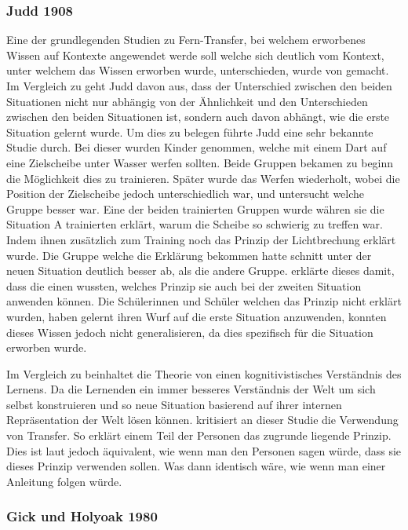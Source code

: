 \subsubsection{Judd 1908}
Eine der grundlegenden Studien zu Fern-Transfer, bei welchem erworbenes Wissen auf Kontexte angewendet werde soll welche sich deutlich vom Kontext, unter welchem das Wissen erworben wurde, unterschieden, wurde von \citet{judd1908} gemacht. Im Vergleich zu \citeauthor{Woodworth1901} geht Judd davon aus, dass der Unterschied zwischen den beiden Situationen nicht nur abhängig von der Ähnlichkeit und den Unterschieden zwischen den beiden Situationen ist, sondern auch davon abhängt, wie die erste Situation gelernt wurde. Um dies zu belegen führte Judd eine sehr bekannte Studie durch. Bei dieser wurden Kinder genommen, welche mit einem Dart auf eine Zielscheibe unter Wasser werfen sollten. Beide Gruppen bekamen zu beginn die Möglichkeit dies zu trainieren. Später wurde das Werfen wiederholt, wobei die Position der Zielscheibe jedoch unterschiedlich war, und untersucht welche Gruppe besser war. Eine der beiden trainierten Gruppen wurde währen sie die Situation A trainierten erklärt, warum die Scheibe so schwierig zu treffen war. Indem ihnen zusätzlich zum Training noch das Prinzip der Lichtbrechung erklärt wurde. Die Gruppe welche die Erklärung bekommen hatte schnitt unter der neuen Situation deutlich besser ab, als die andere Gruppe. \citet{judd1908} erklärte dieses damit, dass die einen wussten, welches Prinzip sie auch bei der zweiten Situation anwenden können. Die Schülerinnen und Schüler welchen das Prinzip nicht erklärt wurden, haben gelernt ihren Wurf auf die erste Situation anzuwenden, konnten dieses Wissen jedoch nicht generalisieren, da dies spezifisch für die Situation erworben wurde. 

Im Vergleich zu \citeauthor{Woodworth1901} beinhaltet die Theorie von \citeauthor{judd1908} einen kognitivistisches Verständnis des Lernens. Da die Lernenden ein immer besseres Verständnis der Welt um sich selbst konstruieren und so neue Situation basierend auf ihrer internen Repräsentation der Welt lösen können. \citet{Detterman1993} kritisiert an dieser Studie die Verwendung von Transfer. So erklärt \citeauthor{judd1908} einem Teil der Personen das zugrunde liegende Prinzip. Dies ist laut \citeauthor{Detterman1993} jedoch äquivalent, wie wenn man den Personen sagen würde, dass sie dieses Prinzip verwenden sollen. Was dann identisch wäre, wie wenn man einer Anleitung folgen würde.

\subsubsection{Gick und Holyoak 1980}

